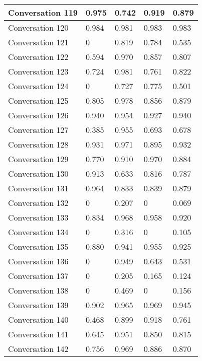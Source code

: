 \begin{table}[]
\begin{tabular}{|l|l|l|l|l|}
Conversation 119 & 0.975    & 0.742 & 0.919       & 0.879   \\ \hline
Conversation 120 & 0.984    & 0.981 & 0.983       & 0.983   \\ \hline
Conversation 121 & 0        & 0.819 & 0.784       & 0.535   \\ \hline
Conversation 122 & 0.594    & 0.970 & 0.857       & 0.807   \\ \hline
Conversation 123 & 0.724    & 0.981 & 0.761       & 0.822   \\ \hline
Conversation 124 & 0        & 0.727 & 0.775       & 0.501   \\ \hline
Conversation 125 & 0.805    & 0.978 & 0.856       & 0.879   \\ \hline
Conversation 126 & 0.940    & 0.954 & 0.927       & 0.940   \\ \hline
Conversation 127 & 0.385    & 0.955 & 0.693       & 0.678   \\ \hline
Conversation 128 & 0.931    & 0.971 & 0.895       & 0.932   \\ \hline
Conversation 129 & 0.770    & 0.910 & 0.970       & 0.884   \\ \hline
Conversation 130 & 0.913    & 0.633 & 0.816       & 0.787   \\ \hline
Conversation 131 & 0.964    & 0.833 & 0.839       & 0.879   \\ \hline
Conversation 132 & 0        & 0.207 & 0           & 0.069   \\ \hline
Conversation 133 & 0.834    & 0.968 & 0.958       & 0.920   \\ \hline
Conversation 134 & 0        & 0.316 & 0           & 0.105   \\ \hline
Conversation 135 & 0.880    & 0.941 & 0.955       & 0.925   \\ \hline
Conversation 136 & 0        & 0.949 & 0.643       & 0.531   \\ \hline
Conversation 137 & 0        & 0.205 & 0.165       & 0.124   \\ \hline
Conversation 138 & 0        & 0.469 & 0           & 0.156   \\ \hline
Conversation 139 & 0.902    & 0.965 & 0.969       & 0.945   \\ \hline
Conversation 140 & 0.468    & 0.899 & 0.918       & 0.761   \\ \hline
Conversation 141 & 0.645    & 0.951 & 0.850       & 0.815   \\ \hline
Conversation 142 & 0.756    & 0.969 & 0.886       & 0.870   \\ \hline

\end{tabular}
\end{table}
